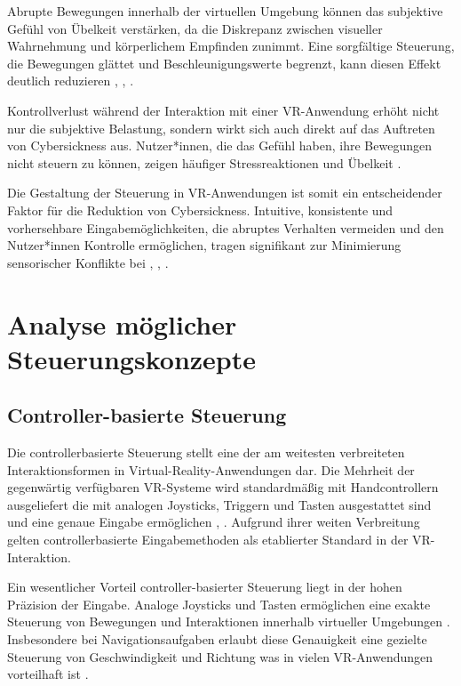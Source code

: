Abrupte Bewegungen innerhalb der virtuellen Umgebung können das subjektive Gefühl von Übelkeit verstärken, da die Diskrepanz zwischen visueller Wahrnehmung und körperlichem Empfinden zunimmt. Eine sorgfältige Steuerung, die Bewegungen glättet und Beschleunigungswerte begrenzt, kann diesen Effekt deutlich reduzieren \cite{Dennison2016}, \cite{Wisti2016}, \cite{Keshavarz2011}.

Kontrollverlust während der Interaktion mit einer VR-Anwendung erhöht nicht nur die subjektive Belastung, sondern wirkt sich auch direkt auf das Auftreten von Cybersickness aus. Nutzer*innen, die das Gefühl haben, ihre Bewegungen nicht steuern zu können, zeigen häufiger Stressreaktionen und Übelkeit \cite{LaViola2000}.

Die Gestaltung der Steuerung in VR-Anwendungen ist somit ein entscheidender Faktor für die Reduktion von Cybersickness. Intuitive, konsistente und vorhersehbare Eingabemöglichkeiten, die abruptes Verhalten vermeiden und den Nutzer*innen Kontrolle ermöglichen, tragen signifikant zur Minimierung sensorischer Konflikte bei \cite{Keshavarz2011}, \cite{LaViola2000}, \cite{Reason1975}.

\section{Analyse möglicher Steuerungskonzepte}

\subsection{Controller-basierte Steuerung}
Die controllerbasierte Steuerung stellt eine der am weitesten verbreiteten Interaktionsformen in Virtual-Reality-Anwendungen dar. Die Mehrheit der gegenwärtig verfügbaren VR-Systeme wird standardmäßig mit Handcontrollern ausgeliefert die mit analogen Joysticks, Triggern und Tasten ausgestattet sind und eine genaue Eingabe ermöglichen \cite{Bowman2012}, \cite{Jason2015}. Aufgrund ihrer weiten Verbreitung gelten controllerbasierte Eingabemethoden als etablierter Standard in der VR-Interaktion.

Ein wesentlicher Vorteil controller-basierter Steuerung liegt in der hohen Präzision der Eingabe. Analoge Joysticks und Tasten ermöglichen eine exakte Steuerung von Bewegungen und Interaktionen innerhalb virtueller Umgebungen \cite{Bowman2012}. Insbesondere bei Navigationsaufgaben erlaubt diese Genauigkeit eine gezielte Steuerung von Geschwindigkeit und Richtung was in vielen VR-Anwendungen vorteilhaft ist \cite{Bowman2012}.


